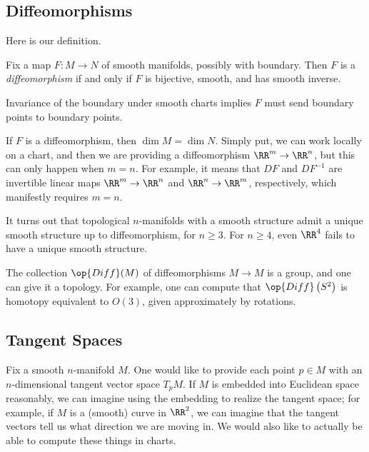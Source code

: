 \documentclass[../notes.tex]{subfiles}
\begin{document}
\subsection{Diffeomorphisms}
Here is our definition.
\begin{definition}[diffeomorphism]
	Fix a map $F\colon M\to N$ of smooth manifolds, possibly with boundary. Then $F$ is a \textit{diffeomorphism} if and only if $F$ is bijective, smooth, and has smooth inverse.
\end{definition}
\begin{remark}
	Invariance of the boundary under smooth charts implies $F$ must send boundary points to boundary points.
\end{remark}
\begin{remark}
	If $F$ is a diffeomorphism, then $\dim M=\dim N$. Simply put, we can work locally on a chart, and then we are providing a diffeomorphism $\RR^m\to\RR^n$, but this can only happen when $m=n$. For example, it means that $DF$ and $DF^{-1}$ are invertible linear maps $\RR^m\to\RR^n$ and $\RR^n\to\RR^m$, respectively, which manifestly requires $m=n$.
\end{remark}
\begin{remark}
	It turns out that topological $n$-manifolds with a smooth structure admit a unique smooth structure up to diffeomorphism, for $n\ge3$. For $n\ge4$, even $\RR^4$ fails to have a unique smooth structure.
\end{remark}
\begin{remark}
	The collection $\op{Diff}(M)$ of diffeomorphisms $M\to M$ is a group, and one can give it a topology. For example, one can compute that $\op{Diff}\left(S^2\right)$ is homotopy equivalent to $O(3)$, given approximately by rotations.
\end{remark}

\subsection{Tangent Spaces}
Fix a smooth $n$-manifold $M$. One would like to provide each point $p\in M$ with an $n$-dimensional tangent vector space $T_pM$. If $M$ is embedded into Euclidean space reasonably, we can imagine using the embedding to realize the tangent space; for example, if $M$ is a (smooth) curve in $\RR^2$, we can imagine that the tangent vectors tell us what direction we are moving in. We would also like to actually be able to compute these things in charts.
\end{document}
